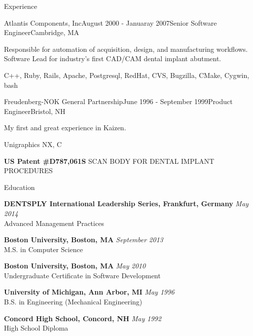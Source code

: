\documentclass{resume}
\begin{document}
\begin{rSection}{Experience}
\begin{rSubsection}{Atlantis Components, Inc}{August 2000 - Januaray 2007}{Senior Software Engineer}{Cambridge, MA}
\item Responsible for automation of acquisition, design, and manufacturing workflows. Software Lead for industry's first CAD/CAM dental implant abutment.
\item C++, Ruby, Rails, Apache, Postgresql, RedHat, CVS, Bugzilla, CMake, Cygwin, bash
\end{rSubsection}


\begin{rSubsection}{Freudenberg-NOK General Partnership}{June 1996 - September 1999}{Product Engineer}{Bristol, NH}
\item My first and great experience in Kaizen.
\item Unigraphics NX, C
\end{rSubsection}
  
\begin{rSubsection}{}{}{}{}
\item \textbf{US Patent \#D787,061S} SCAN BODY FOR DENTAL IMPLANT PROCEDURES
\end{rSubsection}

\end{rSection}



\begin{rSection}{Education}

\item {\bf DENTSPLY International Leadership Series, Frankfurt, Germany} \hfill {\em May 2014} \\
Advanced Management Practices

\item {\bf Boston University, Boston, MA} \hfill {\em September 2013} \\
M.S. in Computer Science

\item {\bf Boston University, Boston, MA} \hfill {\em May 2010} \\
Undergraduate Certificate in Software Development

\item {\bf University of Michigan, Ann Arbor, MI} \hfill {\em May 1996} \\
B.S. in Engineering (Mechanical Engineering)

\item {\bf Concord High School, Concord, NH} \hfill {\em May 1992} \\
High School Diploma

\end{rSection}
\end{document}
